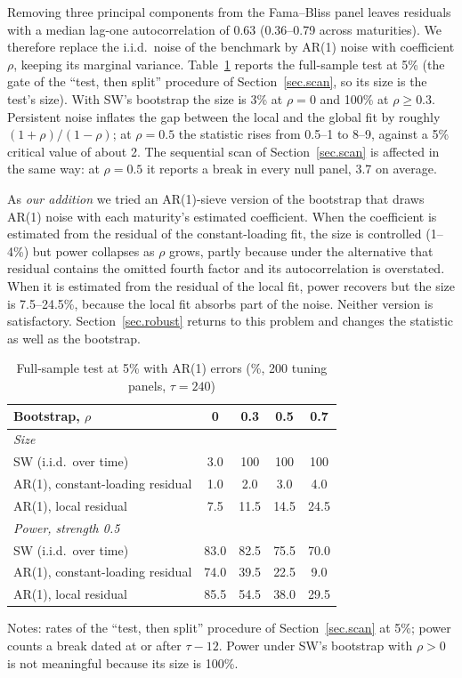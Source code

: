 \documentclass[11pt]{article}
\begin{document}
Removing three principal components from the Fama--Bliss panel leaves residuals with a median lag-one autocorrelation of 0.63 (0.36--0.79 across maturities). We therefore replace the i.i.d.\ noise of the benchmark by AR(1) noise with coefficient $\rho$, keeping its marginal variance. Table~\ref{tab.ar} reports the full-sample test at 5\% (the gate of the ``test, then split'' procedure of Section~\ref{sec.scan}, so its size is the test's size). With SW's bootstrap the size is 3\% at $\rho=0$ and 100\% at $\rho\ge 0.3$. Persistent noise inflates the gap between the local and the global fit by roughly $(1+\rho)/(1-\rho)$; at $\rho=0.5$ the statistic rises from 0.5--1 to 8--9, against a 5\% critical value of about 2. The sequential scan of Section~\ref{sec.scan} is affected in the same way: at $\rho=0.5$ it reports a break in every null panel, 3.7 on average.

As \emph{our addition} we tried an AR(1)-sieve version of the bootstrap that draws AR(1) noise with each maturity's estimated coefficient. When the coefficient is estimated from the residual of the constant-loading fit, the size is controlled (1--4\%) but power collapses as $\rho$ grows, partly because under the alternative that residual contains the omitted fourth factor and its autocorrelation is overstated. When it is estimated from the residual of the local fit, power recovers but the size is 7.5--24.5\%, because the local fit absorbs part of the noise. Neither version is satisfactory. Section~\ref{sec.robust} returns to this problem and changes the statistic as well as the bootstrap.

\begin{table}[htbp]
\centering
\begin{threeparttable}
\caption{Full-sample test at 5\% with AR(1) errors (\%, 200 tuning panels, $\tau=240$)}\label{tab.ar}
\begin{tabular}{lcccc}
\toprule
Bootstrap, $\rho$ & 0 & 0.3 & 0.5 & 0.7\\
\midrule
\multicolumn{5}{l}{\emph{Size}}\\
SW (i.i.d.\ over time) & 3.0 & 100 & 100 & 100\\
AR(1), constant-loading residual & 1.0 & 2.0 & 3.0 & 4.0\\
AR(1), local residual & 7.5 & 11.5 & 14.5 & 24.5\\[3pt]
\multicolumn{5}{l}{\emph{Power, strength 0.5}}\\
SW (i.i.d.\ over time) & 83.0 & 82.5 & 75.5 & 70.0\\
AR(1), constant-loading residual & 74.0 & 39.5 & 22.5 & 9.0\\
AR(1), local residual & 85.5 & 54.5 & 38.0 & 29.5\\
\bottomrule
\end{tabular}
\begin{tablenotes}\small
\item Notes: rates of the ``test, then split'' procedure of Section~\ref{sec.scan} at 5\%; power counts a break dated at or after $\tau-12$. Power under SW's bootstrap with $\rho>0$ is not meaningful because its size is 100\%.
\end{tablenotes}
\end{threeparttable}
\end{table}
\end{document}
